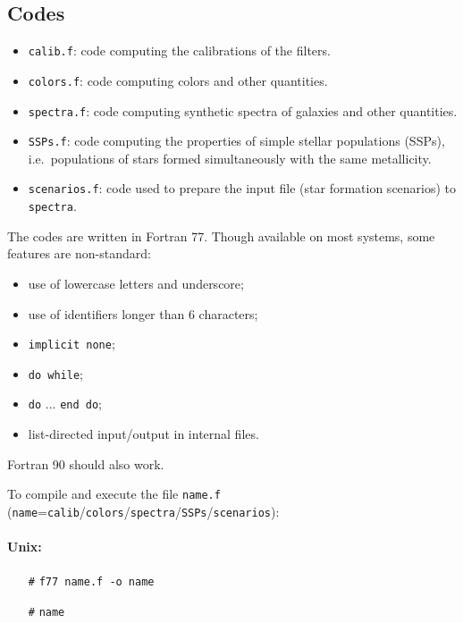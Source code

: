 \documentclass[11pt,draft,fleqn]{article}
\begin{document}
\subsection{Codes}
\begin{itemize}
\item \texttt{calib.f}: code computing the calibrations of the filters.
\item \texttt{colors.f}: code computing colors and other quantities.
\item \texttt{spectra.f}: code computing synthetic spectra of galaxies
and other quantities.
\item \texttt{SSPs.f}: code computing the properties of simple stellar populations (SSPs),
i.e.\ populations of stars formed simultaneously with the same 
metallicity.
\item \texttt{scenarios.f}: code used to prepare the input file (star formation scenarios)
to \texttt{spectra}.
\end{itemize}
The codes are written in Fortran 77. Though available on most systems,
some features are non-standard:
\begin{itemize}
\item use of lowercase letters and underscore;
\item use of identifiers longer than 6 characters;
\item \texttt{implicit none};
\item \texttt{do while};
\item \texttt{do} ... \texttt{end do};
\item list-directed input/output in internal files.
\end{itemize}
Fortran 90 should also work.

To compile and execute the file \texttt{name.f} (\texttt{name}=\texttt{calib}/\linebreak[0]\texttt{colors}/\linebreak[0]\texttt{spectra}/\linebreak[0]\texttt{SSPs}/\linebreak[0]\texttt{scenarios}):
\paragraph{Unix:}
\begin{itemize}
\item[\texttt{\#}]
\texttt{f77 name.f -o name}
\item[\texttt{\#}]
\texttt{name}
\end{itemize}
\end{document}
